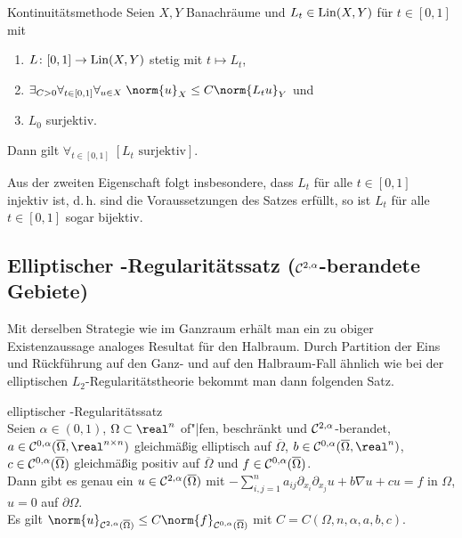 \begin{Satz}{Kontinuitätsmethode}
    Seien $X, Y$ Banachräume und $L_t \in \operatorname{Lin}(X, Y)$ für $t \in [0, 1]$ mit
    \begin{enumerate}
        \item
        $L\colon [0,1] \rightarrow \operatorname{Lin}(X, Y)$ stetig mit $t \mapsto L_t$,
        
        \item
        $\exists_{C > 0} \forall_{t \in [0, 1]} \forall_{u \in X}\;
        \norm{u}_X \le C \norm{L_t u}_Y$ und
        
        \item
        $L_0$ surjektiv.
    \end{enumerate}
    Dann gilt $\forall_{t \in [0, 1]}\; [\text{$L_t$ surjektiv}]$.
\end{Satz}

\begin{Bem}
    Aus der zweiten Eigenschaft folgt insbesondere, dass $L_t$ für alle $t \in [0, 1]$ injektiv
    ist, d.\,h. sind die Voraussetzungen des Satzes erfüllt, so ist
    $L_t$ für alle $t \in [0, 1]$ sogar bijektiv.
\end{Bem}

\subsection{%
    Elliptischer -Regularitätssatz
    (\texorpdfstring{$\mathcal{C}^{2,\alpha}$}{C² ᵅ}-berandete Gebiete)%
}

\begin{Bem}
    Mit derselben Strategie wie im Ganzraum erhält man ein zu obiger Existenzaussage
    analoges Resultat für den Halbraum.
    Durch Partition der Eins und Rückführung auf den Ganz- und auf den Halbraum-Fall ähnlich wie
    bei der elliptischen $L_2$-Regularitätstheorie bekommt man dann folgenden Satz.
\end{Bem}

\begin{Satz}{elliptischer -Regularitätssatz}\\
    Seien $\alpha \in (0, 1)$,
    $\Omega \subset \real^n$ of"|fen, beschränkt und $\mathcal{C}^{2,\alpha}$-berandet,
    $a \in \C^{0,\alpha}(\overline{\Omega}, \real^{n \times n})$
    gleichmäßig elliptisch auf $\overline{\Omega}$,
    $b \in \C^{0,\alpha}(\overline{\Omega}, \real^n)$,
    $c \in \mathcal{C}^{0,\alpha}(\overline{\Omega})$ gleichmäßig positiv auf $\overline{\Omega}$ und
    $f \in \mathcal{C}^{0,\alpha}(\overline{\Omega})$.\\
    Dann gibt es genau ein $u \in \mathcal{C}^{2,\alpha}(\overline{\Omega})$ mit
    $-\sum_{i,j=1}^n a_{ij} \partial_{x_i} \partial_{x_j} u + b \nabla u + cu = f$ in $\Omega$,
    $u = 0$ auf $\partial\Omega$.\\
    Es gilt
    $\norm{u}_{\C^{2,\alpha}(\overline{\Omega})} \le C \norm{f}_{\C^{0,\alpha}(\overline{\Omega})}$
    mit $C = C(\Omega, n, \alpha, a, b, c)$.
\end{Satz}

